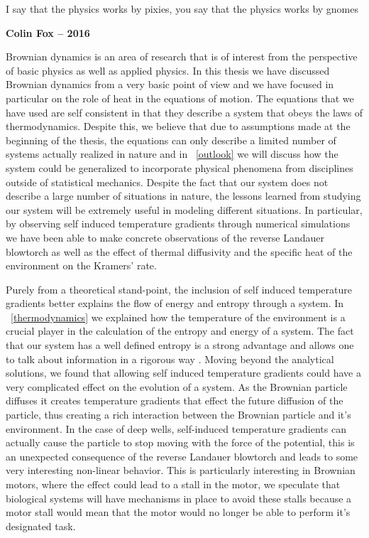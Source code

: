 \epigraph{I say that the physics works by pixies, you say that the physics works by gnomes}{\textbf{Colin Fox -- 2016}}

Brownian dynamics is an area of research that is of interest from the perspective of basic physics as well as applied physics. In this thesis we have discussed Brownian dynamics from a very basic point of view and we have focused in particular on the role of heat in the equations of motion. The equations that we have used are self consistent in that they describe a system that obeys the laws of thermodynamics. Despite this, we believe that due to assumptions made at the beginning of the thesis, the equations can only describe a limited number of systems actually realized in nature and in ~\autoref{outlook} we will discuss how the system could be generalized to incorporate physical phenomena from disciplines outside of statistical mechanics. Despite the fact that our system does not describe a large number of situations in nature, the lessons learned from studying our system will be extremely useful in modeling different situations. In particular, by observing self induced temperature gradients through numerical simulations we have been able to make concrete observations of the reverse Landauer blowtorch as well as the effect of thermal diffusivity and the specific heat of the environment on the Kramers' rate.  

Purely from a theoretical stand-point, the inclusion of self induced temperature gradients better explains the flow of energy and entropy through a system. In ~\autoref{thermodynamics} we explained how the temperature of the environment is a crucial player in the calculation of the entropy and energy of a system. The fact that our system has a well defined entropy is a strong advantage and allows one to talk about information in a rigorous way \cite{Landauer1961,MyersCelebranoKrishnan2015}. Moving beyond the analytical solutions, we found that allowing self induced temperature gradients could have a very complicated effect on the evolution of a system. As the Brownian particle diffuses it creates temperature gradients that effect the future diffusion of the particle, thus creating a rich interaction between the Brownian particle and it's environment. In the case of deep wells, self-induced temperature gradients can actually cause the particle to stop moving with the force of the potential, this is an unexpected consequence of the reverse Landauer blowtorch and leads to some very interesting non-linear behavior. This is particularly interesting in Brownian motors, where the effect could lead to a stall in the motor, we speculate that biological systems will have mechanisms in place to avoid these stalls because a motor stall would mean that the motor would no longer be able to perform it's designated task.


